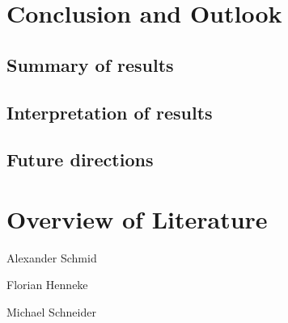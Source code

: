 \documentclass[conference]{IEEEtran}
\begin{document}
\section{Conclusion and Outlook}
\label{ref:conclusion}
	\subsection{Summary of results}
	\subsection{Interpretation of results}
	\subsection{Future directions}


\section{Overview of Literature}
Alexander Schmid \cite{Akram2017} \cite{Arm2020} \cite{Asanovic2014} \cite{HeuiLee2001} \cite{Patterson2019} \cite{Perotti2020} \cite{Shore2015} \cite{Waterman2016} \cite{Xu2003}

Florian Henneke \cite{Waterman2016} \cite{Ryzhyk2006} \cite{Asanovic2014} \cite{Furber2000} \cite{Microsoft2020} \cite{Greenwaves2020} \cite{Aws2020} \cite{Microsoft2020}

Michael Schneider \cite{Waterman2017} \cite{Arm2020} \cite{George1990} \cite{Waterman2016} \cite{50years} \cite{hennessy2012computer} \cite{drechsler2020enhanced} \cite{WisconsinMadison2016} \cite{IEEE2018} \cite{Dirvin2019} \cite{Bandic2019} \cite{Berkeley2019}



\end{document}
